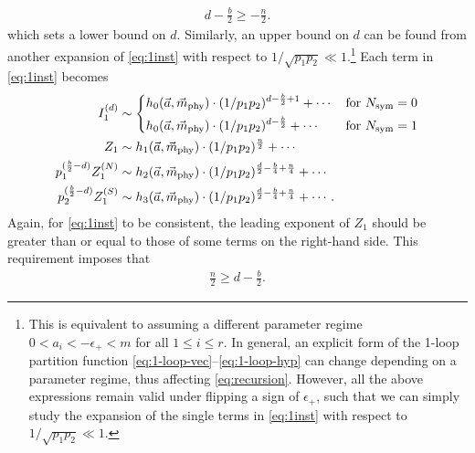 \documentclass[letterpaper, 11pt]{article}
\newcommand{\nn}{\nonumber}
\def\e{\epsilon}
\begin{document}
{\begin{align}
     d - \frac{b}{2} \geq -\frac{n}{2}.
\end{align}
which sets a lower bound on $d$. 
%
Similarly, an upper bound on $d$ can be found from another expansion of \eqref{eq:1inst} with respect to $ 1/\sqrt{p_1p_2} \ll 1$.\footnote{This is equivalent to assuming a different parameter regime $ 0 < a_i < -\e_+ < m$ for all $1\leq i \leq r$. In general, an explicit form of the 1-loop partition function \eqref{eq:1-loop-vec}--\eqref{eq:1-loop-hyp} can change depending on a parameter regime, thus affecting \eqref{eq:recursion}. However, all the above expressions remain valid under flipping a sign of $\epsilon_+$, such that we can simply study the expansion of the single terms in \eqref{eq:1inst} with respect to $ 1/\sqrt{p_1p_2} \ll 1$.} 
Each term in \eqref{eq:1inst} becomes
\begin{align}
  I_1^{(d)} &\sim \begin{dcases}
    h_0(\vec{a},  \vec{m}_{\text{phy}})\cdot  (1/p_1p_2)^{d-\frac{b}{2} + 1} + \cdots   &  \text{for }N_\text{sym} = 0\\
    h_0(\vec{a},  \vec{m}_{\text{phy}})\cdot (1/p_1p_2)^{d-\frac{b}{2} } + \cdots    &  \text{for }N_\text{sym} = 1
\end{dcases}
  \nn \\
  Z_1 &\sim   h_1(\vec{a},  \vec{m}_{\text{phy}})\cdot (1/p_1p_2)^{\frac{n}{2}}  + \cdots  \nn \\
  p_1^{(\frac{b}{2}-d)}Z_1^{(N)} &\sim  h_2(\vec{a},  \vec{m}_{\text{phy}})\cdot  (1/p_1p_2)^{\frac{d}{2}-\frac{b}{4}+\frac{n}{4}}   + \cdots   \nn \\
  p_2^{(\frac{b}{2}-d)}  Z^{(S)}_1&\sim  h_3(\vec{a},  \vec{m}_{\text{phy}})\cdot (1/p_1p_2)^{\frac{d}{2}-\frac{b}{4}+\frac{n}{4}}  + \cdots   .
\end{align}
Again, for \eqref{eq:1inst} to be consistent, the leading exponent of $Z_1$ should be greater than or equal to those of some terms on the right-hand side. This requirement imposes that
\begin{align}
  \label{eq:lowerbound}
      \frac{n}{2} \geq  d - \frac{b}{2}.
\end{align}

}
\end{document}
